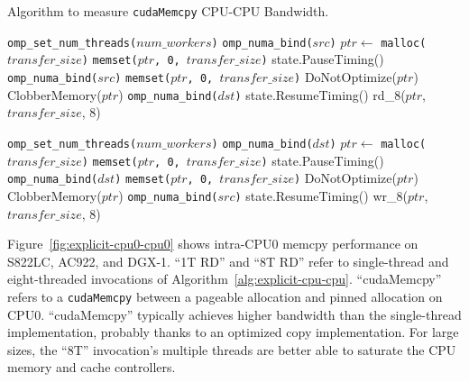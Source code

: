 \begin{algorithm}
	\caption[test]{
		Algorithm to measure \texttt{cudaMemcpy} CPU-CPU Bandwidth.
	}
	\label{alg:explicit-cpu-cpu}
	\begin{algorithmic}[1]
        \Statex
		\State \texttt{omp\_set\_num\_threads($num\_workers$)}
		\State \texttt{omp\_numa\_bind($src$)}
        \State $ptr \gets$ \texttt{malloc($transfer\_size$)}
        \State \texttt{memset($ptr$, 0, $transfer\_size$)}
		\Statex
		\State state.PauseTiming()
		\State \texttt{omp\_numa\_bind($src$)}
		\State \texttt{memset($ptr$, 0, $transfer\_size$)}
		\State DoNotOptimize($ptr$)
		\State ClobberMemory($ptr$)
		\State \texttt{omp\_numa\_bind($dst$)}
		\State state.ResumeTiming()
		\State rd\_8($ptr$, $transfer\_size$, 8)
        \EndFor
		\EndFunction
        
        \Statex
		\State \texttt{omp\_set\_num\_threads($num\_workers$)}
		\State \texttt{omp\_numa\_bind($dst$)}
        \State $ptr \gets$ \texttt{malloc($transfer\_size$)}
        \State \texttt{memset($ptr$, 0, $transfer\_size$)}
		\Statex
		\State state.PauseTiming()
		\State \texttt{omp\_numa\_bind($dst$)}
		\State \texttt{memset($ptr$, 0, $transfer\_size$)}
		\State DoNotOptimize($ptr$)
		\State ClobberMemory($ptr$)
		\State \texttt{omp\_numa\_bind($src$)}
		\State state.ResumeTiming()
		\State wr\_8($ptr$, $transfer\_size$, 8)
        \EndFor
		\EndFunction
		
	\end{algorithmic}
\end{algorithm}


Figure~\ref{fig:explicit-cpu0-cpu0} shows intra-CPU0 memcpy performance on S822LC, AC922, and DGX-1.
``1T RD'' and ``8T RD'' refer to single-thread and eight-threaded invocations of Algorithm~\ref{alg:explicit-cpu-cpu}.
``cudaMemcpy'' refers to a \texttt{cudaMemcpy} between a pageable allocation and pinned allocation on CPU0.
``cudaMemcpy'' typically achieves higher bandwidth than the single-thread implementation, probably thanks to an optimized copy implementation.
For large sizes, the ``8T'' invocation's multiple threads are better able to saturate the CPU memory and cache controllers.


